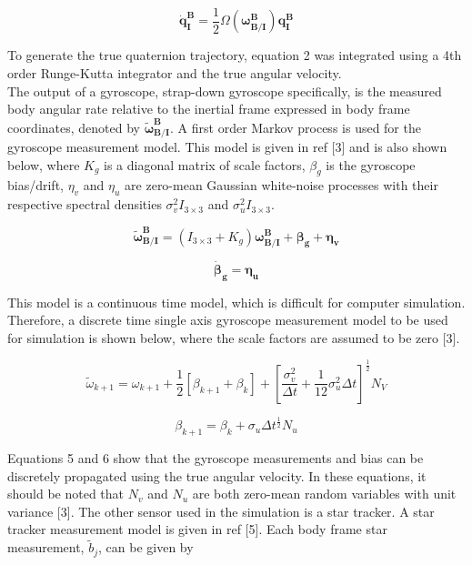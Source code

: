 \documentclass[12pt]{report}
\begin{document}
\begin{equation}
	\pmb{\dot{q}_I^B} = \frac{1}{2}\Omega(\pmb{\omega_{B/I}^B})\pmb{q_I^B}
\end{equation}  

\noindent To generate the true quaternion trajectory, equation 2 was integrated using a 4th order Runge-Kutta integrator and the true angular velocity. \\

\noindent The output of a gyroscope, strap-down gyroscope specifically, is the measured body angular rate relative to the inertial frame expressed in body frame coordinates, denoted by $\pmb{\tilde{\omega}_{B/I}^B}$. A first order Markov process is used for the gyroscope measurement model. This model is given in ref [3] and is also shown below, where $K_g$ is a diagonal matrix of scale factors, $\beta_g$ is the gyroscope bias/drift, $\eta_v$ and $\eta_u$ are zero-mean Gaussian white-noise processes with their respective spectral densities $\sigma_v^2 I_{3\times3}$ and $\sigma_u^2 I_{3\times3}$.

\begin{equation}
\pmb{\tilde{\omega}_{B/I}^B} = (I_{3\times3} + K_g)\pmb{\omega_{B/I}^B} + \pmb{\beta_g} + \pmb{\eta_v}
\end{equation}

\begin{equation}
	\pmb{\dot{\beta}_g} = \pmb{\eta_u}
\end{equation}

\noindent This model is a continuous time model, which is difficult for computer simulation. Therefore, a discrete time single axis gyroscope measurement model to be used for simulation is shown below, where the scale factors are assumed to be zero [3]. 

\begin{equation}
\tilde{\omega}_{k+1} = \omega_{k+1} + \frac{1}{2}[\beta_{k+1} + \beta_k] + [\frac{\sigma_v^2}{\Delta t} + \frac{1}{12}\sigma_u^2 \Delta t]^\frac{1}{2} N_V
\end{equation}

\begin{equation}
	\beta_{k+1} = \beta_k + \sigma_u \Delta t^\frac{1}{2} N_u
\end{equation}

\noindent Equations 5 and 6 show that the gyroscope measurements and bias can be discretely propagated using the true angular velocity. In these equations, it should be noted that $N_v$ and $N_u$ are both zero-mean random variables with unit variance [3]. The other sensor used in the simulation is a star tracker. A star tracker measurement model is given in ref [5]. Each body frame star measurement, $\tilde{b}_j$, can be given by
\end{document}
